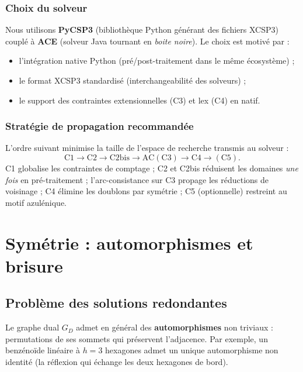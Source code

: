 \documentclass[12pt,a4paper]{article}
\theoremstyle{definition}
\theoremstyle{remark}
\newcommand{\GD}{G_{\!D}}
\begin{document}
\subsubsection{Choix du solveur}

Nous utilisons \textbf{PyCSP3} (biblioth\`eque Python g\'en\'erant des
fichiers XCSP3) coupl\'e \`a \textbf{ACE} (solveur Java tournant en
\emph{boite noire}). Le choix est motiv\'e par :
\begin{itemize}
  \item l'int\'egration native Python (pr\'e/post-traitement dans le m\^eme
        \'ecosyst\`eme) ;
  \item le format XCSP3 standardis\'e (interchangeabilit\'e des solveurs) ;
  \item le support des contraintes extensionnelles (C3) et lex (C4) en
        natif.
\end{itemize}

\subsubsection{Strat\'egie de propagation recommand\'ee}

L'ordre suivant minimise la taille de l'espace de recherche transmis au
solveur :
\[
  \text{C1} \to \text{C2} \to \text{C2bis} \to \text{AC}(\text{C3}) \to \text{C4} \to (\text{C5}).
\]
C1 globalise les contraintes de comptage ; C2 et C2bis r\'eduisent les
domaines \emph{une fois} en pr\'e-traitement ; l'arc-consistance sur C3
propage les r\'eductions de voisinage ; C4 \'elimine les doublons par
sym\'etrie ; C5 (optionnelle) restreint au motif azul\'enique.

\section{Sym\'etrie : automorphismes et brisure}
\label{sec:symetrie}

\subsection{Probl\`eme des solutions redondantes}

Le graphe dual $\GD$ admet en g\'en\'eral des \textbf{automorphismes}
non triviaux : permutations de ses sommets qui pr\'eservent l'adjacence.
Par exemple, un benz\'eno\"ide lin\'eaire \`a $h = 3$ hexagones admet un
unique automorphisme non identit\'e (la r\'eflexion qui \'echange les
deux hexagones de bord).
\end{document}
